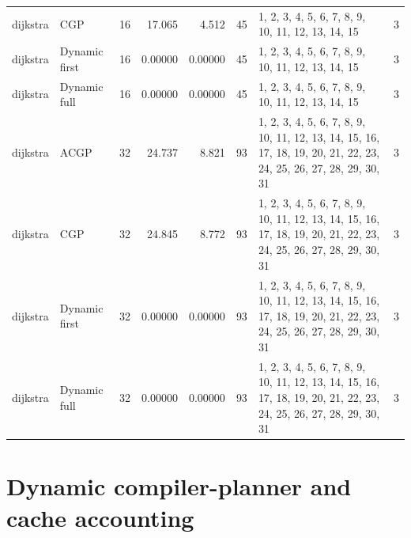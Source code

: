 \documentclass[10pt,a4paper]{article}
\begin{document}
\begin{longtable}{@{}p{23mm}p{29mm}rrrrp{36mm}r@{}}
dijkstra & CGP & 16 & 17.065 & 4.512 & 45 & 1, 2, 3, 4, 5, 6, 7, 8, 9, 10, 11, 12, 13, 14, 15 & 3 \\
dijkstra & Dynamic first & 16 & 0.00000 & 0.00000 & 45 & 1, 2, 3, 4, 5, 6, 7, 8, 9, 10, 11, 12, 13, 14, 15 & 3 \\
dijkstra & Dynamic full & 16 & 0.00000 & 0.00000 & 45 & 1, 2, 3, 4, 5, 6, 7, 8, 9, 10, 11, 12, 13, 14, 15 & 3 \\
dijkstra & ACGP & 32 & 24.737 & 8.821 & 93 & 1, 2, 3, 4, 5, 6, 7, 8, 9, 10, 11, 12, 13, 14, 15, 16, 17, 18, 19, 20, 21, 22, 23, 24, 25, 26, 27, 28, 29, 30, 31 & 3 \\
dijkstra & CGP & 32 & 24.845 & 8.772 & 93 & 1, 2, 3, 4, 5, 6, 7, 8, 9, 10, 11, 12, 13, 14, 15, 16, 17, 18, 19, 20, 21, 22, 23, 24, 25, 26, 27, 28, 29, 30, 31 & 3 \\
dijkstra & Dynamic first & 32 & 0.00000 & 0.00000 & 93 & 1, 2, 3, 4, 5, 6, 7, 8, 9, 10, 11, 12, 13, 14, 15, 16, 17, 18, 19, 20, 21, 22, 23, 24, 25, 26, 27, 28, 29, 30, 31 & 3 \\
dijkstra & Dynamic full & 32 & 0.00000 & 0.00000 & 93 & 1, 2, 3, 4, 5, 6, 7, 8, 9, 10, 11, 12, 13, 14, 15, 16, 17, 18, 19, 20, 21, 22, 23, 24, 25, 26, 27, 28, 29, 30, 31 & 3 \\
\end{longtable}\normalsize\setlength{\tabcolsep}{6pt}
\clearpage
\section*{Dynamic compiler-planner and cache accounting}
\clearpage
\end{document}
